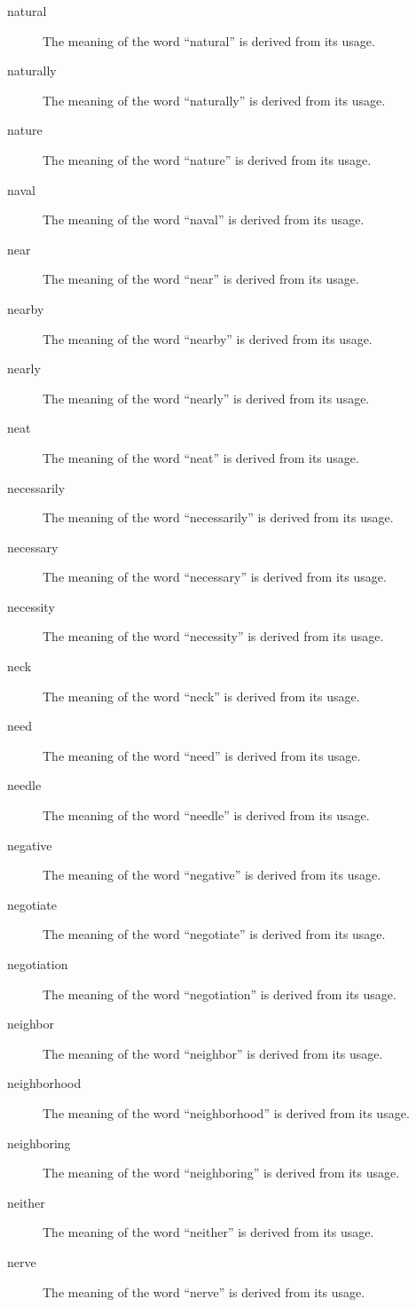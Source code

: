 \documentclass[12pt, letterpaper]{memoir}
\begin{document}
\begin{description}
\item[natural] The meaning of the word ``natural'' is derived from its usage.
\item[naturally] The meaning of the word ``naturally'' is derived from its usage.
\item[nature] The meaning of the word ``nature'' is derived from its usage.
\item[naval] The meaning of the word ``naval'' is derived from its usage.
\item[near] The meaning of the word ``near'' is derived from its usage.
\item[nearby] The meaning of the word ``nearby'' is derived from its usage.
\item[nearly] The meaning of the word ``nearly'' is derived from its usage.
\item[neat] The meaning of the word ``neat'' is derived from its usage.
\item[necessarily] The meaning of the word ``necessarily'' is derived from its usage.
\item[necessary] The meaning of the word ``necessary'' is derived from its usage.
\item[necessity] The meaning of the word ``necessity'' is derived from its usage.
\item[neck] The meaning of the word ``neck'' is derived from its usage.
\item[need] The meaning of the word ``need'' is derived from its usage.
\item[needle] The meaning of the word ``needle'' is derived from its usage.
\item[negative] The meaning of the word ``negative'' is derived from its usage.
\item[negotiate] The meaning of the word ``negotiate'' is derived from its usage.
\item[negotiation] The meaning of the word ``negotiation'' is derived from its usage.
\item[neighbor] The meaning of the word ``neighbor'' is derived from its usage.
\item[neighborhood] The meaning of the word ``neighborhood'' is derived from its usage.
\item[neighboring] The meaning of the word ``neighboring'' is derived from its usage.
\item[neither] The meaning of the word ``neither'' is derived from its usage.
\item[nerve] The meaning of the word ``nerve'' is derived from its usage.

\end{description}
\end{document}
